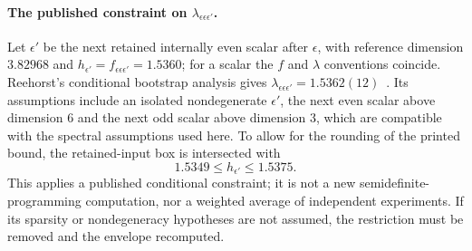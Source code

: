 \paragraph{The published constraint on $\lambda_{\epsilon\epsilon\epsilon'}$.} Let $\epsilon'$ be the next retained
internally even scalar after $\epsilon$, with reference dimension $3.82968$ and $h_{\epsilon'}=f_{\epsilon\epsilon\epsilon'}=1.5360$;
for a scalar the $f$ and $\lambda$ conventions coincide. Reehorst's conditional bootstrap analysis gives
$\lambda_{\epsilon\epsilon\epsilon'}=1.5362(12)$~\cite{sri:Reehorst:2021}. Its assumptions include an isolated
nondegenerate $\epsilon'$, the next even scalar above dimension 6 and the next odd scalar above dimension 3, which are
compatible with the spectral assumptions used here. To allow for the rounding of the printed bound, the retained-input
box is intersected with
\begin{equation}
 1.5349\le h_{\epsilon'}\le1.5375 .
 \label{sri:eq:cone:reehorst}
\end{equation}
This applies a published conditional constraint; it is not a new semidefinite-programming computation, nor a weighted
average of independent experiments. If its sparsity or nondegeneracy hypotheses are not assumed, the restriction must
be removed and the envelope recomputed.

